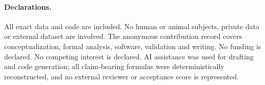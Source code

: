 \documentclass[10pt]{article}
\begin{document}
\paragraph{Declarations.}
All exact data and code are included.  No human or animal subjects, private
data or external dataset are involved.  The anonymous contribution record
covers conceptualization, formal analysis, software, validation and writing.
No funding is declared.  No competing interest is declared.  AI assistance
was used for drafting and code generation; all claim-bearing formulas were
deterministically reconstructed, and no external reviewer or acceptance score
is represented.
\end{document}
